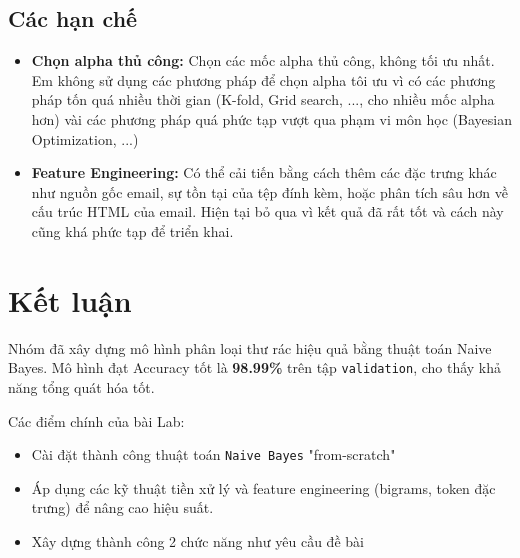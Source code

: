 \subsection{Các hạn chế}
\begin{itemize}
    \item \textbf{Chọn alpha thủ công:} Chọn các mốc alpha thủ công, không tối ưu nhất. Em không sử dụng các phương pháp để chọn alpha tôi ưu vì có các phương pháp tốn quá nhiều thời gian (K-fold, Grid search, ..., cho nhiều mốc alpha hơn) vài các phương pháp quá phức tạp vượt qua phạm vi môn học (Bayesian Optimization, ...)
    \item \textbf{Feature Engineering:} Có thể cải tiến bằng cách thêm các đặc trưng khác như nguồn gốc email, sự tồn tại của tệp đính kèm, hoặc phân tích sâu hơn về cấu trúc HTML của email. Hiện tại bỏ qua vì kết quả đã rất tốt và cách này cũng khá phức tạp để triển khai.
\end{itemize}

\section{Kết luận}
 Nhóm đã xây dựng mô hình phân loại thư rác hiệu quả bằng thuật toán Naive Bayes. Mô hình đạt Accuracy tốt là \textbf{98.99\%} trên tập \texttt{validation}, cho thấy khả năng tổng quát hóa tốt.

Các điểm chính của bài Lab:
\begin{itemize}
    \item Cài đặt thành công thuật toán \texttt{Naive Bayes} "from-scratch"
    \item Áp dụng các kỹ thuật tiền xử lý và feature engineering (bigrams, token đặc trưng) để nâng cao hiệu suất.
    \item Xây dựng thành công 2 chức năng như yêu cầu đề bài 
\end{itemize}